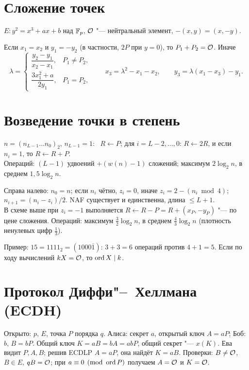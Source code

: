 \documentclass{ca-handout}
\begin{document}
\makehandouttitle

\section{Сложение точек}
$E\colon y^2 = x^3 + ax + b$ над $\mathbb{F}_p$, $\mathcal{O}$ "--- нейтральный элемент, $-(x, y) = (x, -y)$.
\begin{reminder}[title={$P_1 + P_2 = P_3$, $P_i = (x_i, y_i)$}]
Если $x_1 = x_2$ и $y_1 = -y_2$ (в частности, $2P$ при $y = 0$), то $P_1 + P_2 = \mathcal{O}$. Иначе
\[
  \lambda = \begin{cases} \dfrac{y_2 - y_1}{x_2 - x_1}, & P_1 \ne P_2,\\[8pt]
  \dfrac{3x_1^2 + a}{2y_1}, & P_1 = P_2,\end{cases} \qquad
  x_3 = \lambda^2 - x_1 - x_2, \qquad y_3 = \lambda(x_1 - x_3) - y_1.
\]
\end{reminder}

\section{Возведение точки в степень}
\begin{reminder}[title={«Удвоение"--~сложение» (слева направо)}]
$n = (n_{L-1} \dots n_0)_2$, $n_{L-1} = 1$: \ $R \gets P$; для $i = L - 2, \dots, 0$:
$R \gets 2R$, и если $n_i = 1$, то $R \gets R + P$. \\
Операций: $(L - 1)$ удвоений $+ (w(n) - 1)$ сложений; максимум $2\log_2 n$, в среднем
$1{,}5\log_2 n$.
\end{reminder}

\begin{reminder}[title={Тернарное разложение (NAF): $n = \sum z_i 2^i$, $z_i \in \{-1, 0, 1\}$, $z_i z_{i+1} = 0$}]
Справа налево: $n_0 = n$; если $n_i$ чётно, $z_i = 0$, иначе $z_i = 2 - (n_i \bmod 4)$;
$n_{i+1} = (n_i - z_i)/2$. NAF существует и единственна, длина $\le L + 1$. \\
В схеме выше при $z_i = -1$ выполняется $R \gets R - P = R + (x_P, -y_P)$ "--- по цене сложения.
Операций: максимум $\frac32\log_2 n$, в среднем $\frac43\log_2 n$ (плотность ненулевых цифр $\frac13$).
\end{reminder}
Пример: $15 = 1111_2 = (1000\bar 1)$: $3 + 3 = 6$ операций против $4 + 1 = 5$.
Если по ходу вычислений $kX = \mathcal{O}$, то $\operatorname{ord} X \mid k$.

\section{Протокол Диффи"--~Хеллмана (ECDH)}
Открыто: $p$, $E$, точка $P$ порядка $q$. Алиса: секрет $a$, открытый ключ $A = aP$; Боб:
$b$, $B = bP$. Общий ключ $K = aB = bA = abP$, общий секрет "--- $x(K)$. Ева видит $P, A, B$;
решив ECDLP $A = aP$, она найдёт $K = aB$. Проверки: $B \ne \mathcal{O}$, $B \in E$, $qB = \mathcal{O}$; при
$a \equiv 0 \pmod{\operatorname{ord} P}$ получаем $A = \mathcal{O}$ и $K = \mathcal{O}$.
\end{document}
